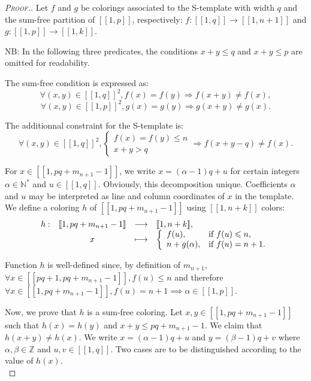 \begin{proof}[\textsc{Proof.}]
	Let \(f\) and \(g\) be colorings associated to the S-template with width \(q\) and the sum-free partition of 
	\([\![1,p]\!]\), respectively: \(f : [\![1,q]\!] \longrightarrow [\![1,n+1]\!]\) and 
	\(g : [\![1,p]\!] \longrightarrow [\![1,k]\!]\).
	
	\par
	NB: In the following three predicates, the conditions \(x + y \leqslant q\)  and \(x + y \leqslant p\) are omitted for readability.
	\par
	The sum-free condition is expressed as:
	\[\forall (x,y) \in [\![1,q]\!]^2, f(x) = f(y) \Longrightarrow f(x+y) \neq f(x),\]
	\[\forall (x,y) \in [\![1,p]\!]^2, g(x) = g(y) \Longrightarrow g(x+y) \neq g(x).\]
	
	The additionnal constraint for the S-template is:
	\[
	\forall (x,y) \in [\![1,q]\!]^2, \left\{
	\begin{array}{l}
		f(x) = f(y) \leqslant n \\
		x + y > q
	\end{array}
	\right. \Longrightarrow f(x+y-q) \neq f(x).
	\]
	
	For \(x \in [\![1,pq+m_{n+1}-1]\!]\), we write \(x = (\alpha - 1) q + u\) for certain integers \(\alpha \in \mathbb{N}^*\) 
	and \(u \in [\![1,q]\!]\). Obviously, this decomposition unique. Coefficients \(\alpha\) and \(u\) may be interpreted as line 
	and column coordinates of \(x\) in the template. We define a coloring \(h\) of \([\![1,pq+m_{n+1}-1]\!]\) using \( [\![1,n+k]\!]\) colors:
	\[
	\begin{array}{c c c l}
		h : & [\![1,pq+m_{n+1}-1]\!] & \longrightarrow & [\![1,n+k]\!], \\
		& x & \longmapsto & 
		\left\{ \begin{array}{l l}
			f(u), & \text{if}~f(u) \leqslant n, \\
			n + g(\alpha), & \text{if}~f(u) = n + 1. \\
		\end{array} \right.
	\end{array}
	\]
	
	Function \(h\) is well-defined since, by definition of \(m_{n+1}\), \(\forall x \in [\![p q + 1, p q + m_{n + 1} - 1 ]\!], f(u) 
	\leqslant n\) and therefore \(\forall x \in [\![1,pq+m_{n+1}-1]\!], f(u) = n + 1 \implies \alpha \in [\![1, p]\!]\).
	
	\par
	Now, we prove that \(h\) is a sum-free coloring. Let \(x,y \in [\![1,pq + m_{n+1}-1]\!]\) such that \(h(x) = h(y)\) 
	and \(x+y \leqslant pq+m_{n+1}-1\). We claim that \(h(x+y) \neq h(x)\). We write \(x = (\alpha - 1) q + u\) and 
	\(y = (\beta - 1) q + v\) where \(\alpha, \beta \in \mathbb{Z}\) and \(u, v \in [\![1,q]\!]\). Two cases are to be
	distinguished according to the value of \(h(x)\). \\
	

\end{proof}
